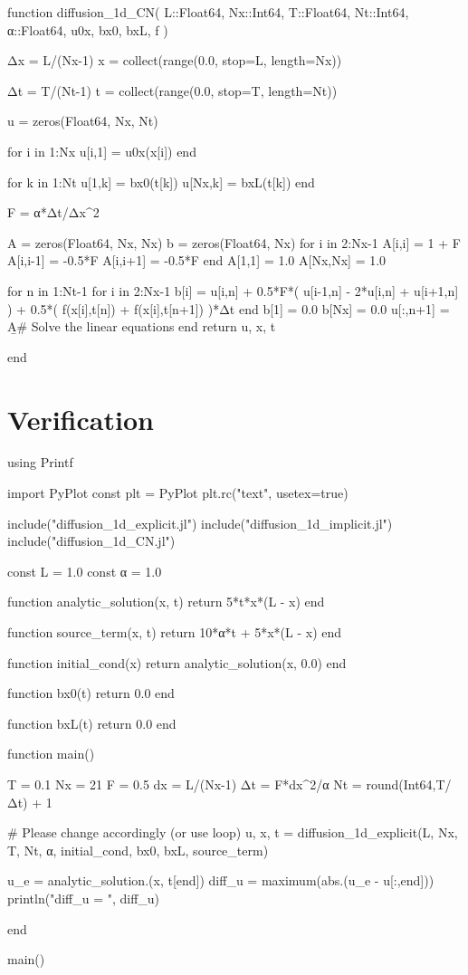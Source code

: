\documentclass[a4paper,11pt]{article}
\begin{document}
\begin{juliacode}
function diffusion_1d_CN(
    L::Float64, Nx::Int64, T::Float64, Nt::Int64,
    α::Float64, u0x, bx0, bxL, f
)

    Δx = L/(Nx-1)
    x = collect(range(0.0, stop=L, length=Nx))

    Δt = T/(Nt-1)
    t = collect(range(0.0, stop=T, length=Nt))

    u = zeros(Float64, Nx, Nt)

    for i in 1:Nx
        u[i,1] = u0x(x[i])
    end

    for k in 1:Nt
        u[1,k] = bx0(t[k])
        u[Nx,k] = bxL(t[k])
    end

    F = α*Δt/Δx^2

    A = zeros(Float64, Nx, Nx)
    b = zeros(Float64, Nx)
    for i in 2:Nx-1
        A[i,i] = 1 + F
        A[i,i-1] = -0.5*F
        A[i,i+1] = -0.5*F
    end
    A[1,1] = 1.0
    A[Nx,Nx] = 1.0

    for n in 1:Nt-1
        for i in 2:Nx-1
            b[i] = u[i,n] + 0.5*F*( u[i-1,n] - 2*u[i,n] + u[i+1,n] ) +
                   0.5*( f(x[i],t[n]) + f(x[i],t[n+1]) )*Δt
        end
        b[1] = 0.0
        b[Nx] = 0.0
        u[:,n+1] = A\b  # Solve the linear equations
    end
    return u, x, t

end
\end{juliacode}


\section{Verification}

\begin{juliacode}
using Printf

import PyPlot
const plt = PyPlot
plt.rc("text", usetex=true)

include("diffusion_1d_explicit.jl")
include("diffusion_1d_implicit.jl")
include("diffusion_1d_CN.jl")

const L =  1.0
const α = 1.0

function analytic_solution(x, t)
    return 5*t*x*(L - x)
end

function source_term(x, t)
    return 10*α*t + 5*x*(L - x)
end

function initial_cond(x)
    return analytic_solution(x, 0.0)
end

function bx0(t)
    return 0.0
end

function bxL(t)
    return 0.0
end

function main()
    
    T = 0.1
    Nx = 21
    F = 0.5
    dx = L/(Nx-1)
    Δt = F*dx^2/α
    Nt = round(Int64,T/Δt) + 1

    # Please change accordingly (or use loop)
    u, x, t = diffusion_1d_explicit(L, Nx, T, Nt, α, initial_cond, bx0, bxL, source_term)

    u_e = analytic_solution.(x, t[end])
    diff_u = maximum(abs.(u_e - u[:,end]))
    println("diff_u = ", diff_u)

end

main()
\end{juliacode}
\end{document}

